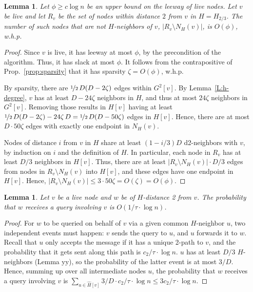 \documentclass[12pt,a4]{article}
\newtheorem{lemma}[theorem]{Lemma}
\begin{document}
\begin{lemma}
Let $\phi \ge c\log n$ be an upper bound on the leeway of live nodes. 
Let $v$ be live and let $R_v$ be the set of nodes within distance $2$ from $v$ in $H = H_{2/3}$. The number of such nodes that are not $H$-neighbors of $v$, $|R_v \setminus N_H(v)|$, is $O(\phi)$, w.h.p.
\label{L:h4set}
\end{lemma}
%
\begin{proof}
Since $v$ is live, it has leeway at most $\phi$, by
the precondition of the algorithm. Thus, it has slack at most $\phi$.
It follows from the contrapositive of Prop.~\ref{prop:sparsity} that it has sparsity $\zeta = O(\phi)$, w.h.p.

By sparsity, there are $\nicefrac{1}{2}\, D(D - 2\zeta)$ edges within $G^2[v]$.
By Lemma~\ref{L:h-degree}, $v$ has at least $D - 24\zeta$ neighbors in $H$, and thus at most $24\zeta$ neighbors in $G^2[v]$. Removing those results in $H[v]$ having at least $\nicefrac{1}{2}\, D(D - 2\zeta) - 24\zeta\, D  = \nicefrac{1}{2}\, D(D - 50\zeta)$ edges in $H[v]$. Hence, there are at most $D \cdot 50\zeta$ edges with exactly one endpoint in $N_H(v)$.

Nodes of distance $i$ from $v$ in $H$ share at least $(1-i/3)D$ d2-neighbors with $v$, by induction on $i$ and the definition of $H$. In particular, each node in $R_v$ has at least $D/3$ neighbors in $H[v]$. Thus, there are at least $|R_v \setminus N_H(v)| \cdot D/3$ edges from nodes in $R_v \setminus N_H(v)$ into $H[v]$, and these edges have one endpoint in $H[v]$. Hence, $|R_v \setminus N_H(v)| \le 3\cdot 50 \zeta = O(\zeta) = O(\phi)$.
\end{proof}



\begin{lemma}
Let $v$ be a live node and $w$ be of $H$-distance 2 from $v$.
The probability that $w$ receives a query involving $v$ is $O(1/\tau \cdot \log n)$.
\label{L:reqprob}
\end{lemma}

\begin{proof}
For $w$ to be queried on behalf of $v$ via a given common $H$-neighbor $u$, two independent events must happen: $v$ sends the query to $u$, and $u$ forwards it to $w$. Recall that $u$ only accepts the message if it has a unique 2-path to $v$, and the probability that it gets sent along this path is $c_2/\tau \cdot \log n$. $u$ has at least $D/3$ $H$-neighbors (Lemma yy), so the probability of the latter event is at most $3/D$. 
Hence, summing up over all intermediate nodes $u$, the probability that $w$ receives a query involving $v$ is $\sum_{u \in \hat{H}[v]} 3/D \cdot c_2/\tau \cdot \log n \le 3c_2/\tau \cdot \log n$.
\end{proof}
\end{document}
